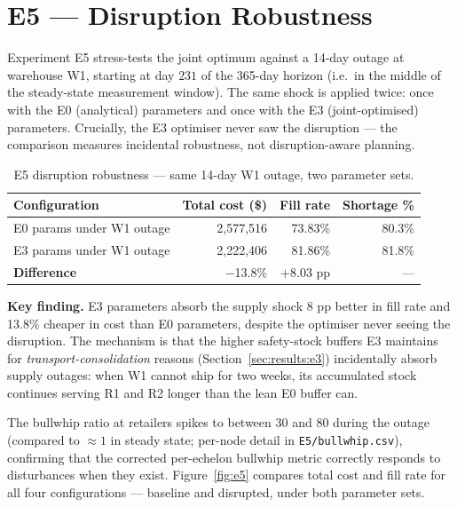 \section{E5 --- Disruption Robustness}
\label{sec:results:e5}

Experiment E5 stress-tests the joint optimum against a 14-day outage at
warehouse W1, starting at day $231$ of the 365-day horizon (i.e.\ in
the middle of the steady-state measurement window).  The same shock is
applied twice: once with the E0 (analytical) parameters and once with
the E3 (joint-optimised) parameters.  Crucially, the E3 optimiser never
saw the disruption — the comparison measures incidental robustness, not
disruption-aware planning.

\begin{table}[htbp]
  \centering
  \caption{E5 disruption robustness — same 14-day W1 outage, two parameter sets.}
  \label{tab:e5}
  \begin{tabular}{@{}lrrr@{}}
    \toprule
    Configuration & Total cost (\$) & Fill rate & Shortage \% \\
    \midrule
    E0 params under W1 outage & 2,577,516 & 73.83\% & 80.3\% \\
    E3 params under W1 outage & 2,222,406 & 81.86\% & 81.8\% \\
    \midrule
    \textbf{Difference} & $-$13.8\% & $+$8.03 pp & --- \\
    \bottomrule
  \end{tabular}
\end{table}

\textbf{Key finding.}  E3 parameters absorb the supply shock 8 pp
better in fill rate and 13.8\% cheaper in cost than E0 parameters,
despite the optimiser never seeing the disruption.  The mechanism is
that the higher safety-stock buffers E3 maintains for
\emph{transport-consolidation} reasons (Section~\ref{sec:results:e3})
incidentally absorb supply outages: when W1 cannot ship for two weeks,
its accumulated stock continues serving R1 and R2 longer than the lean
E0 buffer can.

The bullwhip ratio at retailers spikes to between 30 and 80 during the
outage (compared to $\approx 1$ in steady state; per-node detail in \texttt{E5/bullwhip.csv}), confirming that the
corrected per-echelon bullwhip metric correctly responds to
disturbances when they exist.
Figure~\ref{fig:e5} compares total cost and fill rate for all four
configurations — baseline and disrupted, under both parameter sets.

